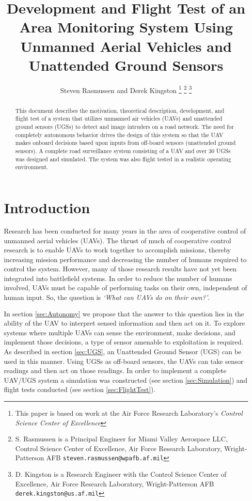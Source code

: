 \documentclass[letterpaper, 12 pt, conference]{ieeeconf}  %
\title{\LARGE \bf
Development and Flight Test of an Area Monitoring System Using Unmanned Aerial Vehicles and Unattended Ground Sensors 
}
\author{Steven Rasmussen and Derek Kingston%
\thanks{This paper is based on work at the Air Force Research Laboratory's \emph{Control Science Center of Excellence}}%
\thanks{S. Rasmussen is a Principal Engineer for Miami Valley Aerospace LLC, Control Science Center of Excellence, Air Force Research Laboratory, Wright-Patterson AFB
        {\tt\small steven.rasmussen@wpafb.af.mil}}%
\thanks{D. Kingston is a Research Engineer with the Control Science Center of Excellence, Air Force Research Laboratory, Wright-Patterson AFB
        {\tt\small derek.kingston@us.af.mil}}%
}
\theoremstyle{definition}
\begin{document}
\maketitle
\thispagestyle{empty}
\pagestyle{empty}


\begin{abstract}
%
This document describes the motivation, theoretical description, development, and flight test of a system that utilizes unmanned air vehicles (UAVs) and unattended ground sensors (UGSs) to detect and image intruders on a road network. The need for completely autonomous behavior drives the design of this system so that the UAV makes onboard decisions based upon inputs from off-board sensors (unattended ground sensors). A complete road surveillance system consisting of a UAV and over 30 UGSs was designed and simulated. The system was also flight tested in a realistic operating environment.
%
\end{abstract}
%
%

\section{Introduction}
Research has been conducted for many years in the area of cooperative control of unmanned aerial vehicles (UAVs). The thrust of much of cooperative control research is to enable UAVs to work together to accomplish missions, thereby increasing mission performance and decreasing the number of humans required to control the system. However, many of those research results have not yet been integrated into battlefield systems. In order to reduce the number of humans involved, UAVs must be capable of performing tasks on their own, independent of human input. So, the question is \emph{`What can UAVs do on their own?'}.

In section \ref{sec:Autonomy} we propose that the answer to this question lies in the ability of the UAV to interpret sensed information and then act on it. To explore systems where multiple UAVs can sense the environment, make decisions, and implement those decisions, a type of sensor amenable to exploitation is required. As described in section \ref{sec:UGS}, an Unattended Ground Sensor (UGS) can be used in this manner. Using UGSs as off-board sensors, the UAVs can take sensor readings and then act on those readings\cite{kingston2012,krishnaCDC14,krishnaACC14}. In order to implement a complete UAV/UGS system a simulation was constructed (see section \ref{sec:Simulation}) and flight tests conducted (see section \ref{sec:FlightTest}).
\end{document}
